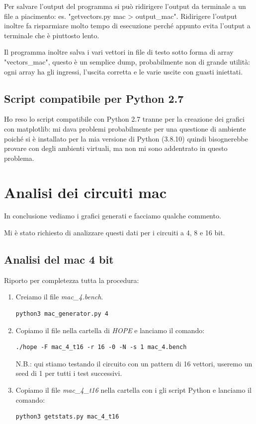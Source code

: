 \documentclass[12pt, letterpaper]{article}
\begin{document}
Per salvare l'output del programma si può ridirigere l'output da terminale a un file a piacimento: es. "getvectors.py mac > output\_mac".
Ridirigere l'output inoltre fa risparmiare molto tempo di esecuzione perché appunto evita l'output a terminale che è piuttosto lento. 

Il programma inoltre salva i vari vettori in file di testo sotto forma di array "vectors\_mac", questo è un semplice dump, probabilmente non di grande utilità: ogni array ha gli ingressi, l'uscita corretta e le varie uscite con guasti iniettati.

\subsection{Script compatibile per Python 2.7}

Ho reso lo script compatibile con Python 2.7 tranne per la creazione dei grafici con matplotlib: mi dava problemi probabilmente per una questione di ambiente poiché si è installato per la mia versione di Python (3.8.10) quindi bisognerebbe provare con degli ambienti virtuali, ma non mi sono addentrato in questo problema.

\section{Analisi dei circuiti mac}

In conclusione vediamo i grafici generati e facciamo qualche commento.

Mi è stato richiesto di analizzare questi dati per i circuiti a 4, 8 e 16 bit.

\subsection{Analisi del mac 4 bit}

Riporto per completezza tutta la procedura:

\begin{enumerate}
\item Creiamo il file \textit{mac\_4.bench}.
\begin{lstlisting}
python3 mac_generator.py 4
\end{lstlisting}
\item Copiamo il file nella cartella di \textit{HOPE} e lanciamo il comando:
\begin{lstlisting}
./hope -F mac_4_t16 -r 16 -0 -N -s 1 mac_4.bench
\end{lstlisting}
N.B.: qui stiamo testando il circuito con un pattern di 16 vettori, useremo un seed di 1 per tutti i test successivi.
\item Copiamo il file \textit{mac\_4\_t16} nella cartella con i gli script Python e lanciamo il comando:
\begin{lstlisting}
python3 getstats.py mac_4_t16
\end{lstlisting}
\end{enumerate}
\end{document}
